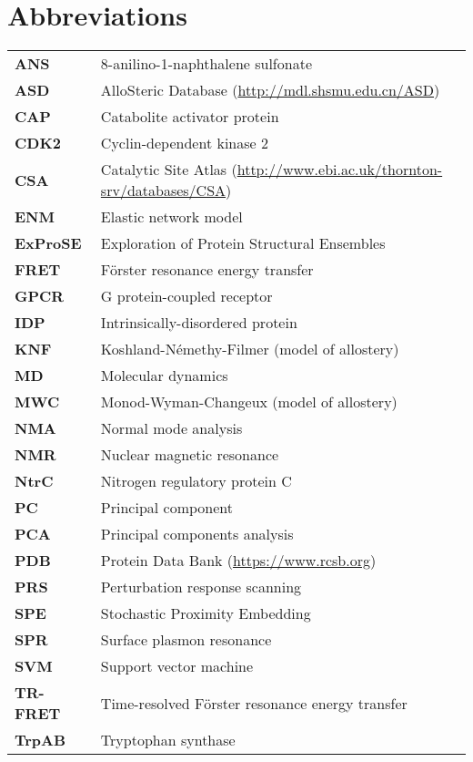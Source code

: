 \chapter*{Abbreviations}

\begin{tabular}{ >{\bfseries}l l }
ANS      &  8-anilino-1-naphthalene sulfonate \\
ASD      &  AlloSteric Database (\url{http://mdl.shsmu.edu.cn/ASD}) \\
CAP      &  Catabolite activator protein \\
CDK2     &  Cyclin-dependent kinase 2 \\
CSA      &  Catalytic Site Atlas (\url{http://www.ebi.ac.uk/thornton-srv/databases/CSA}) \\
ENM      &  Elastic network model \\
ExProSE  &  Exploration of Protein Structural Ensembles \\
FRET     &  F\"{o}rster resonance energy transfer \\
GPCR     &  G protein-coupled receptor \\
IDP      &  Intrinsically-disordered protein \\
KNF      &  Koshland-N\'{e}methy-Filmer (model of allostery) \\
MD       &  Molecular dynamics \\
MWC      &  Monod-Wyman-Changeux (model of allostery) \\
NMA      &  Normal mode analysis \\
NMR      &  Nuclear magnetic resonance \\
NtrC     &  Nitrogen regulatory protein C \\
PC       &  Principal component \\
PCA      &  Principal components analysis \\
PDB      &  Protein Data Bank (\url{https://www.rcsb.org}) \\
PRS      &  Perturbation response scanning \\
SPE      &  Stochastic Proximity Embedding \\
SPR      &  Surface plasmon resonance \\
SVM      &  Support vector machine \\
TR-FRET  &  Time-resolved F\"{o}rster resonance energy transfer \\
TrpAB    &  Tryptophan synthase \\
\end{tabular}
